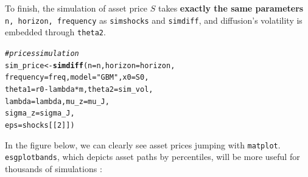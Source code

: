 \documentclass[a4paper]{article}\usepackage[]{graphicx}\usepackage[]{color}
\makeatletter
\newcommand{\hlnum}[1]{\textcolor[rgb]{0.686,0.059,0.569}{#1}}%
\newcommand{\hlstr}[1]{\textcolor[rgb]{0.192,0.494,0.8}{#1}}%
\newcommand{\hlcom}[1]{\textcolor[rgb]{0.678,0.584,0.686}{\textit{#1}}}%
\newcommand{\hlopt}[1]{\textcolor[rgb]{0,0,0}{#1}}%
\newcommand{\hlstd}[1]{\textcolor[rgb]{0.345,0.345,0.345}{#1}}%
\newcommand{\hlkwb}[1]{\textcolor[rgb]{0.69,0.353,0.396}{#1}}%
\newcommand{\hlkwc}[1]{\textcolor[rgb]{0.333,0.667,0.333}{#1}}%
\newcommand{\hlkwd}[1]{\textcolor[rgb]{0.737,0.353,0.396}{\textbf{#1}}}%
\newenvironment{kframe}{%
 \def\at@end@of@kframe{}%
 \ifinner\ifhmode%
  \def\at@end@of@kframe{\end{minipage}}%
  \begin{minipage}{\columnwidth}%
 \fi\fi%
 \def\FrameCommand##1{\hskip\@totalleftmargin \hskip-\fboxsep
 \colorbox{shadecolor}{##1}\hskip-\fboxsep
     \hskip-\linewidth \hskip-\@totalleftmargin \hskip\columnwidth}%
 \MakeFramed {\advance\hsize-\width
   \@totalleftmargin\z@ \linewidth\hsize
   \@setminipage}}%
 {\par\unskip\endMakeFramed%
 \at@end@of@kframe}
\newenvironment{knitrout}{}{} %
\newcommand{\code}[1]{\mbox{\texttt{#1}}}
\makeatother
\begin{document}
To finish, the simulation of asset price $S$ takes {\bf exactly the same parameters} \code{n, horizon, frequency} as \code{simshocks} and \code{simdiff}, and diffusion's volatility is embedded through \code{theta2}.

\begin{knitrout}
\color{fgcolor}\begin{kframe}
\begin{alltt}
\hlcom{# prices simulation}
\hlstd{sim_price} \hlkwb{<-} \hlkwd{simdiff}\hlstd{(}\hlkwc{n} \hlstd{= n,} \hlkwc{horizon} \hlstd{= horizon,}
                     \hlkwc{frequency} \hlstd{= freq,} \hlkwc{model} \hlstd{=} \hlstr{"GBM"}\hlstd{,} \hlkwc{x0} \hlstd{= S0,}
                     \hlkwc{theta1} \hlstd{= r0} \hlopt{-} \hlstd{lambda}\hlopt{*}\hlstd{m,} \hlkwc{theta2} \hlstd{= sim_vol,}
                     \hlkwc{lambda} \hlstd{= lambda,} \hlkwc{mu_z} \hlstd{= mu_J,}
                     \hlkwc{sigma_z} \hlstd{= sigma_J,}
                     \hlkwc{eps} \hlstd{= shocks[[}\hlnum{2}\hlstd{]])}
\end{alltt}
\end{kframe}
\end{knitrout}

In the figure below, we can clearly see asset prices jumping with \code{matplot}. \code{esgplotbands}, which depicts asset paths by percentiles, will be more useful for thousands of simulations : 
\end{document}
